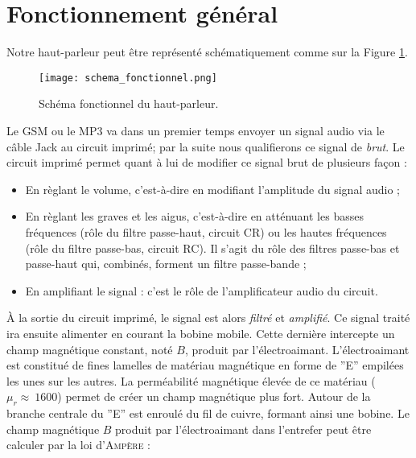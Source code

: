 

\section{Fonctionnement général}
Notre haut-parleur peut être représenté schématiquement comme sur la Figure \ref{block-diagram-hp}.

\begin{figure}[!htb]
	\centering
	\texttt{[image: schema\_fonctionnel.png]}
	\caption{Schéma fonctionnel du haut-parleur.}
	\label{block-diagram-hp}
\end{figure}

Le GSM ou le MP3 va dans un premier temps envoyer un signal audio via le câble Jack au circuit
imprimé; par la suite nous qualifierons ce signal de \textit{brut}. Le circuit imprimé permet
quant à lui de modifier ce signal brut de plusieurs façon : 

\begin{itemize}
	\item En règlant le volume, c'est-à-dire en modifiant l'amplitude du signal audio ;
	\item En règlant les graves et les aigus, c'est-à-dire en atténuant les basses fréquences
	(rôle du filtre passe-haut, circuit CR) ou les hautes
	fréquences (rôle du filtre passe-bas, circuit RC). Il s'agit du rôle des filtres passe-bas 
	et passe-haut qui,  combinés, forment un filtre passe-bande ;
	\item En amplifiant le signal : c'est le rôle de l'amplificateur audio du circuit.
\end{itemize}

À la sortie du circuit imprimé, le signal est alors \textit{filtré} et \textit{amplifié}.
Ce signal traité ira ensuite alimenter en courant la bobine mobile. Cette 
dernière intercepte un champ magnétique constant, noté $B$, produit par l'électroaimant.
L'électroaimant est constitué de fines lamelles de matériau magnétique en forme de ''E'' 
empilées les unes sur les autres. La perméabilité magnétique élevée de ce matériau
($\mu_r \approx \ 1600$) permet de créer un champ magnétique plus fort. Autour de la branche
centrale du ''E'' est enroulé du fil de cuivre, formant ainsi une bobine.
Le champ magnétique $B$ produit par l'électroaimant dans l'entrefer peut être calculer par la 
loi d'\textsc{Ampère} :

